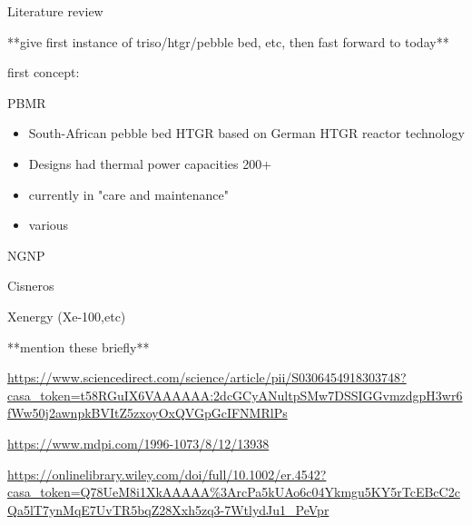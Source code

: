 Literature review

**give first instance of triso/htgr/pebble bed, etc, then fast forward to today**

first concept:

PBMR
\begin{itemize}
\item South-African pebble bed HTGR based on German HTGR reactor technology
\item Designs had thermal power capacities 200+
\item currently in "care and maintenance"
\item various 
\end{itemize}  


NGNP

Cisneros

Xenergy (Xe-100,etc)

**mention these briefly**

\url{https://www.sciencedirect.com/science/article/pii/S0306454918303748?casa_token=t58RGuIX6VAAAAAA:2dcGCyANultpSMw7DSSIGGvmzdgpH3wr6fWw50j2awnpkBVItZ5zxoyOxQVGpGcIFNMRlPs}

\url{https://www.mdpi.com/1996-1073/8/12/13938}

\url{https://onlinelibrary.wiley.com/doi/full/10.1002/er.4542?casa_token=Q78UeM8i1XkAAAAA%3ArcPa5kUAo6c04Ykmgu5KY5rTcEBcC2cQa5lT7ynMqE7UvTR5bqZ28Xxh5zq3-7WtlydJu1_PeVpr}

